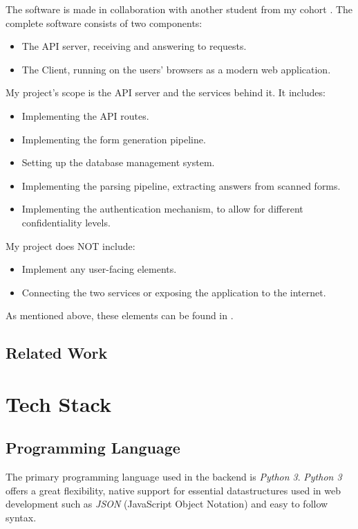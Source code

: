 \documentclass[12pt, a4paper]{report}
\begin{document}
The software is made in collaboration with another student from my cohort \cite{felix}.
The complete software consists of two components:
\begin{itemize}
    \item The API server, receiving and answering to requests.
    \item The Client, running on the users' browsers as a modern web application.
\end{itemize}
My project's scope is the API server and the services behind it. It includes:
\begin{itemize}
    \item Implementing the API routes.
    \item Implementing the form generation pipeline.
    \item Setting up the database management system.
    \item Implementing the parsing pipeline, extracting answers from scanned forms.
    \item Implementing the authentication mechanism, to allow for different confidentiality levels.
\end{itemize}
My project does NOT include:
\begin{itemize}
    \item Implement any user-facing elements.
    \item Connecting the two services or exposing the application to the internet.
\end{itemize}
As mentioned above, these elements can be found in \cite{felix}.

\section{Related Work}


\chapter{Tech Stack}

\section{Programming Language}

The primary programming language used in the backend is \textit{Python 3}.
\textit{Python 3} offers a great flexibility, native support for essential datastructures used in web development such as \textit{JSON} (JavaScript Object Notation) and easy to follow syntax.
\end{document}
